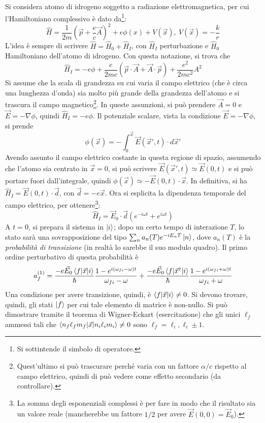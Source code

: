 \documentclass[11pt, a4paper]{scrartcl} %
\numberwithin{equation}{subsection}
\theoremstyle{style2}
\theoremstyle{style1}
\begin{document}
Si considera atomo di idrogeno soggetto a radiazione elettromagnetica, per cui l'Hamiltoniano complessivo \`e dato da\footnote{Si sottintende il simbolo di operatore.}:
\begin{equation}
	\hat{H} =\frac{1}{2m} \left(\vec{p} + \frac{e}{c} \vec{A}\right) ^2 + e \phi (x) + V(\vec{x}), \ V (\vec{x}) = - \frac{k}{r}
\end{equation}
L'idea \`e sempre di scrivere $\hat{H} = \hat{H}_0 + \hat{H}_I$, con $\hat{H}_I$ perturbazione e $\hat{H}_0$ Hamiltoniano dell'atomo di idrogeno.
Con questa notazione, si trova che
\[
\hat{H}_I = -e \phi  + \frac{e}{2mc} \left(\vec{p}\cdot \vec{A} + \vec{A}\cdot \vec{p}\right) + \frac{e^2}{2mc^2}A^2
\] 
Si assume che la scala di grandezza su cui varia il campo elettrico (che \`e circa una lunghezza d'onda) sia molto pi\`u grande della grandezza dell'atomo e si trascura il campo magnetico\footnote{Quest'ultimo si pu\`o trascurare perch\'e varia con un fattore $\alpha  / c$ rispetto al campo elettrico, quindi di pu\`o vedere come effetto secondario (da controllare).}.
In queste assunzioni, si pu\`o prendere $\vec{A} = 0 $ e $\vec{E} = - \nabla \phi $, quindi $\hat{H}_I = - e \phi $.
Il potenziale scalare, vista la condizione $\vec{E} = - \nabla \phi $, si prende
\begin{equation}
	\phi (\vec{x}) = -\int_0^{\vec{x}} \vec{E}(\vec{x}',t) \cdot d \vec{x}'
\end{equation}
Avendo assunto il campo elettrico costante in questa regione di spazio, assumendo che l'atomo sia centrato in $\vec{x}= 0$, si pu\`o scrivere $\vec{E}(\vec{x}', t ) \simeq \vec{E} (0,t)$ e si pu\`o portare fuori dall'integrale, quindi $\phi (\vec{x}) \simeq - \vec{E}(0,t) \cdot \vec{x}$.
In definitiva, si ha $\hat{H}_I = \vec{E}(0,t) \cdot \vec{d}$, con $\vec{d}= -e \vec{x}$.
Ora si esplicita la dipendenza temporale del campo elettrico, per ottenere\footnote{La somma degli esponenziali complessi \`e per fare in modo che il risultato sia un valore reale (mancherebbe un fattore $1 / 2$ per avere $\vec{E}(0,0) = \vec{E}_0$).}:
\begin{equation}
	\hat{H}_I = \vec{E}_0 \cdot \vec{d} \left(e^{-i\omega t}  + e^{i\omega t} \right) 
\end{equation}
A $t=0$, si prepara il sistema in $\ket{i} $; dopo un certo tempo di interazione $T$, lo stato sar\`a una sovrapposizione del tipo $\sum_{n}^{} a_n(T) e^{-i E_n T } \ket{n} $, dove $a_n(T)$ \`e la \textit{probabilit\`a di transizione} (in realt\`a lo sarebbe il suo modulo quadro).
Il primo ordine perturbativo di questa probabilit\`a \`e
\[
a_f^{(1)} = \frac{-e\vec{E}_0\braket{f|\vec{x}|i} }{\hbar } \frac{1- e^{i (\omega_{fi} -\omega) t } }{\omega_{fi} - \omega}+\frac{-e\vec{E}_0\braket{f|\vec{x}^\dagger |i} }{\hbar } \frac{1- e^{i (\omega_{fi} +\omega) t } }{\omega_{fi} + \omega}
\] 
Una condizione per avere transizione, quindi, \`e $\braket{f|\vec{x}|i} \neq 0 $.
Si devono trovare, quindi, gli stati $\ket{f} $ per cui tale elemento di matrice \`e non-nullo.
Si pu\`o dimostrare tramite il teorema di Wigner-Eckart (esercitazione) che gli unici $\ell _f $ ammessi tali che $\braket{n_f \ell _fm_f|\vec{x}|n_i \ell _i m_i} \neq 0$ sono $\ell _f = \ell _i, \ell _i \pm 1$.
\end{document}
